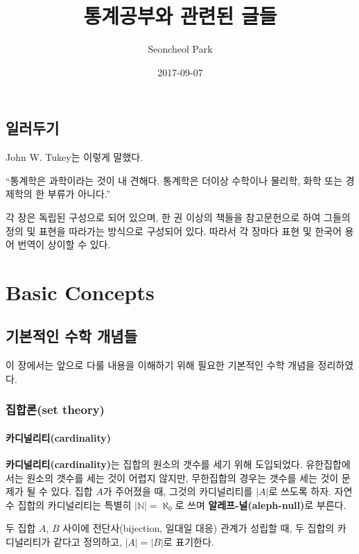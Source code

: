 \documentclass[b5paper,]{scrbook}
\title{통계공부와 관련된 글들}
\author{Seoncheol Park}
\date{2017-09-07}
\theoremstyle{plain}
\theoremstyle{definition}
\numberwithin{equation}{section}
\let\BeginKnitrBlock\begin \let\EndKnitrBlock\end
\begin{document}
\maketitle

{
\hypersetup{linkcolor=Black}
\setcounter{tocdepth}{2}
\tableofcontents
}
\chapter{일러두기}

John W. Tukey는 이렇게 말했다.

``통계학은 과학이라는 것이 내 견해다. 통계학은 더이상 수학이나 물리학,
화학 또는 경제학의 한 부류가 아니다.''

각 장은 독립된 구성으로 되어 있으며, 한 권 이상의 책들을 참고문헌으로
하여 그들의 정의 및 표현을 따라가는 방식으로 구성되어 있다. 따라서 각
장마다 표현 및 한국어 용어 번역이 상이할 수 있다.

\mainmatter

\part{Basic Concepts}\label{part-basic-concepts}

\chapter{기본적인 수학 개념들}\label{math}

이 장에서는 앞으로 다룰 내용을 이해하기 위해 필요한 기본적인 수학 개념을
정리하였다.

\section{집합론(set theory)}\label{set-theory}

\subsection{카디널리티(cardinality)}\label{cardinality}

\textbf{카디널리티(cardinality)}는 집합의 원소의 갯수를 세기 위해
도입되었다. 유한집합에서는 원소의 갯수를 세는 것이 어렵지 않지만,
무한집합의 경우는 갯수를 세는 것이 문제가 될 수 있다. 집합 \(A\)가
주어졌을 때, 그것의 카디널리티를 \(|A|\)로 쓰도록 하자. 자연수 집합의
카디널리티는 특별히 \(|\mathbb{N}|=\aleph_{0}\)로 쓰며
\textbf{알레프-널(aleph-null)}로 부른다.

\BeginKnitrBlock{definition}[카디널리티가 같다]
\protect\hypertarget{def:unnamed-chunk-1}{}{\label{def:unnamed-chunk-1}
{} }두 집합 \(A\), \(B\) 사이에
전단사(bijection, 일대일 대응) 관계가 성립할 때, 두 집합의 카디널리티가
같다고 정의하고, \(|A|=|B|\)로 표기한다.
\EndKnitrBlock{definition}
\end{document}

